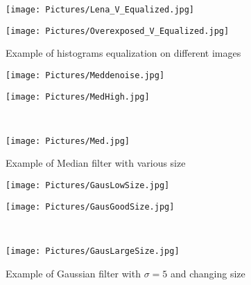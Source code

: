 \documentclass[11pt,a4paper]{article}
\begin{document}
\begin{figure}[htbp]
\begin{minipage}{0.7\textwidth}
  \begin{minipage}{0.4\textwidth}
    \centering
  \texttt{[image: Pictures/Lena\_V\_Equalized.jpg]}
  \end{minipage}%
  \begin{minipage}{0.6\textwidth}
    \centering
  \texttt{[image: Pictures/Overexposed\_V\_Equalized.jpg]}
  \end{minipage}
  \label{fig:v}
  \end{minipage}

\caption{Example of histograms equalization on different images} 
\end{figure}


\begin{figure}[htbp]
\centering
\begin{minipage}{0.5\textwidth}
  \centering
\texttt{[image: Pictures/Meddenoise.jpg]}
\label{fig:mednoise}
\end{minipage}%
\begin{minipage}{0.5\textwidth}
  \centering
\texttt{[image: Pictures/MedHigh.jpg]}
\end{minipage}\\
\begin{center}
\begin{minipage}{0.5\textwidth}
  \centering
\texttt{[image: Pictures/Med.jpg]}
  \end{minipage}
\end{center}
\caption{Example of Median filter with various size}
\end{figure}

\begin{figure}[htbp]
  \centering
  \begin{minipage}{0.5\textwidth}
    \centering
  \texttt{[image: Pictures/GausLowSize.jpg]}
  \end{minipage}%
  \begin{minipage}{0.5\textwidth}
    \centering
  \texttt{[image: Pictures/GausGoodSize.jpg]}
  \label{fig:good}
  \end{minipage}\\
  \begin{center}
  \begin{minipage}{0.5\textwidth}
    \centering
  \texttt{[image: Pictures/GausLargeSize.jpg]}
    \end{minipage}
  \end{center}
  \caption{Example of Gaussian filter with $\sigma=5$ and changing size}
  \end{figure}
\end{document}
